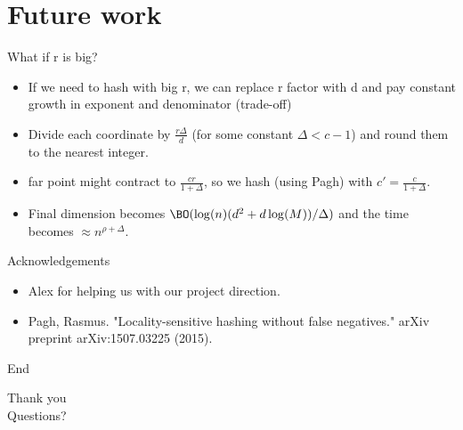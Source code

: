 \documentclass[xcolor=svgnames]{beamer}
\begin{document}
\section{Future work}

\begin{frame}{What if r is big?}
\begin{itemize}
\item If we need to hash with big r, we can replace r factor with d and pay constant growth in exponent and denominator (trade-off)
\item Divide each coordinate by $\tfrac{r\Delta}{d}$ (for some constant $\Delta < c - 1$) and round them to the nearest integer.
\item far point might contract to $\tfrac{cr}{1+\Delta}$, so we hash (using Pagh) with $c'=\tfrac{c}{1+\Delta}$.
\item Final dimension becomes $\BO(\log(n) (d^2 + d \log(M))/\Delta)$ and the time becomes $\approx n^{\rho + \Delta}$.
\end{itemize}
\end{frame}

\begin{frame}{Acknowledgements}
\begin{itemize}
    \item Alex for helping us with our project direction.
    \item Pagh, Rasmus. "Locality-sensitive hashing without false negatives." arXiv preprint arXiv:1507.03225 (2015).
\end{itemize}
\end{frame}

\begin{frame}{End}
\begin{center}
\huge{Thank you}
\\
\vspace{10mm}
\Large{Questions?}
\end{center}
\end{frame}
\end{document}
